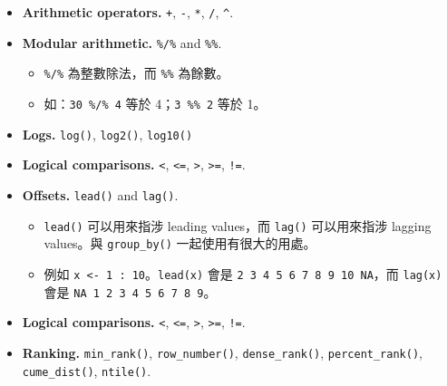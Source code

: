 \documentclass[
]{book}
\theoremstyle{definition}
\theoremstyle{remark}
\begin{document}
\begin{itemize}
\item
  \textbf{Arithmetic operators.} \texttt{+}, \texttt{-}, \texttt{*}, \texttt{/}, \texttt{\^{}}.
\item
  \textbf{Modular arithmetic.} \texttt{\%/\%} and \texttt{\%\%}.

  \begin{itemize}
  \item
    \texttt{\%/\%} 為整數除法，而 \texttt{\%\%} 為餘數。
  \item
    如：\texttt{30\ \%/\%\ 4} 等於 4；\texttt{3\ \%\%\ 2} 等於 1。
  \end{itemize}
\item
  \textbf{Logs.} \texttt{log()}, \texttt{log2()}, \texttt{log10()}
\item
  \textbf{Logical comparisons.} \texttt{\textless{}}, \texttt{\textless{}=}, \texttt{\textgreater{}}, \texttt{\textgreater{}=}, \texttt{!=}.
\item
  \textbf{Offsets.} \texttt{lead()} and \texttt{lag()}.

  \begin{itemize}
  \item
    \texttt{lead()} 可以用來指涉 leading values，而 \texttt{lag()} 可以用來指涉 lagging values。與 \texttt{group\_by()} 一起使用有很大的用處。
  \item
    例如 \texttt{x\ \textless{}-\ 1\ :\ 10}。\texttt{lead(x)} 會是 \texttt{2\ 3\ 4\ 5\ 6\ 7\ 8\ 9\ 10\ NA}，而 \texttt{lag(x)} 會是 \texttt{NA\ 1\ 2\ 3\ 4\ 5\ 6\ 7\ 8\ 9}。
  \end{itemize}
\item
  \textbf{Logical comparisons.} \texttt{\textless{}}, \texttt{\textless{}=}, \texttt{\textgreater{}}, \texttt{\textgreater{}=}, \texttt{!=}.
\item
  \textbf{Ranking.} \texttt{min\_rank()}, \texttt{row\_number()}, \texttt{dense\_rank()}, \texttt{percent\_rank()}, \texttt{cume\_dist()}, \texttt{ntile()}.


\end{itemize}
\end{document}
